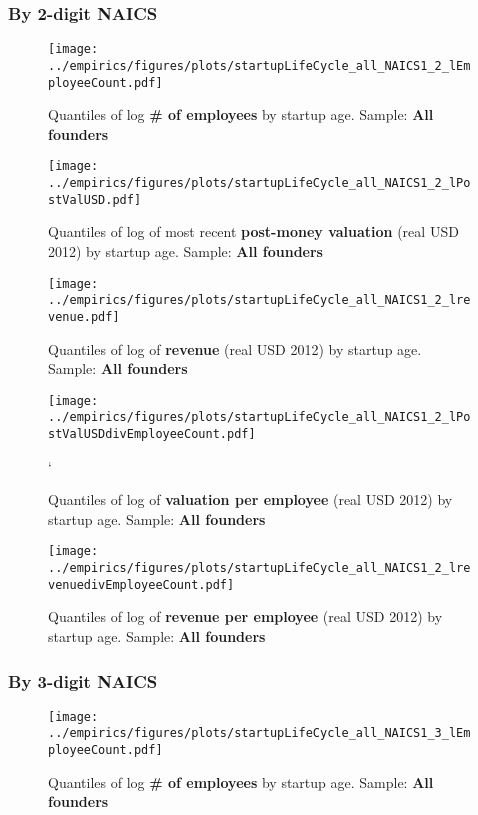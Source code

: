 \documentclass[12pt,english]{article}
\theoremstyle{remark}
\let\Oldsubsubsection\subsubsection
\renewcommand{\subsubsection}{\FloatBarrier\Oldsubsubsection}
\begin{document}
\subsubsection{By 2-digit NAICS}

\begin{figure}[!htb]
	\centering
	\texttt{[image: ../empirics/figures/plots/startupLifeCycle\_all\_NAICS1\_2\_lEmployeeCount.pdf]}
	\caption{Quantiles of log \textbf{\# of employees} by startup age. 
		Sample: \textbf{All founders}}
\end{figure}

\begin{figure}[!htb]
	\centering
	\texttt{[image: ../empirics/figures/plots/startupLifeCycle\_all\_NAICS1\_2\_lPostValUSD.pdf]}
	\caption{Quantiles of log of most recent \textbf{post-money valuation} (real USD 2012) by startup age. 
		Sample: \textbf{All founders}}
\end{figure}

\begin{figure}[!htb]
	\centering
	\texttt{[image: ../empirics/figures/plots/startupLifeCycle\_all\_NAICS1\_2\_lrevenue.pdf]}
	\caption{Quantiles of log of \textbf{revenue} (real USD 2012) by startup age. 
		Sample: \textbf{All founders}}
\end{figure}

\begin{figure}[!htb]
	\centering
	\texttt{[image: ../empirics/figures/plots/startupLifeCycle\_all\_NAICS1\_2\_lPostValUSDdivEmployeeCount.pdf]}
	\caption{Quantiles of log of \textbf{valuation per employee} (real USD 2012) by startup age. 
		Sample: \textbf{All founders}}`
\end{figure}

\begin{figure}[!htb]
	\centering
	\texttt{[image: ../empirics/figures/plots/startupLifeCycle\_all\_NAICS1\_2\_lrevenuedivEmployeeCount.pdf]}
	\caption{Quantiles of log of \textbf{revenue per employee} (real USD 2012) by startup age. 
		Sample: \textbf{All founders}}
\end{figure}

\subsubsection{By 3-digit NAICS}

\begin{figure}[!htb]
	\centering
	\texttt{[image: ../empirics/figures/plots/startupLifeCycle\_all\_NAICS1\_3\_lEmployeeCount.pdf]}
	\caption{Quantiles of log \textbf{\# of employees} by startup age. 
		Sample: \textbf{All founders}}
\end{figure}
\end{document}
